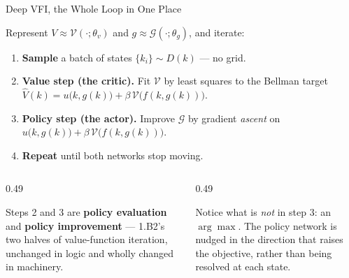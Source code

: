 \begin{frame}{Deep VFI, the Whole Loop in One Place}
\begin{conceptbox}[title=\textbf{Deep value function iteration}]\footnotesize
Represent $V\approx\mathcal{V}(\cdot;\theta_v)$ and $g\approx\mathcal{G}(\cdot;\theta_g)$, and iterate:
\begin{enumerate}\footnotesize\setlength{\itemsep}{0.8mm}
  \item \textbf{Sample} a batch of states $\{k_i\}\sim D(k)$ --- no grid.
  \item \textbf{Value step (the critic).} Fit $\mathcal{V}$ by least squares to the Bellman target
  $\hat V(k)=u\bigl(k,g(k)\bigr)+\beta\,\mathcal{V}\bigl(f(k,g(k))\bigr)$.
  \item \textbf{Policy step (the actor).} Improve $\mathcal{G}$ by gradient \emph{ascent} on
  $u\bigl(k,g(k)\bigr)+\beta\,\mathcal{V}\bigl(f(k,g(k))\bigr)$.
  \item \textbf{Repeat} until both networks stop moving.
\end{enumerate}
\end{conceptbox}
\medskip
\begin{columns}[T]
\begin{column}{0.49\textwidth}
\begin{takeawaybox}\footnotesize
Steps 2 and 3 are \textbf{policy evaluation} and \textbf{policy improvement} --- 1.B2's two halves of value-function iteration, unchanged in logic and wholly changed in machinery.
\end{takeawaybox}
\end{column}
\begin{column}{0.49\textwidth}
\begin{cautionbox}\footnotesize
Notice what is \emph{not} in step 3: an $\arg\max$. The policy network is nudged in the direction that raises the objective, rather than being resolved at each state.
\end{cautionbox}
\end{column}
\end{columns}
\end{frame}

